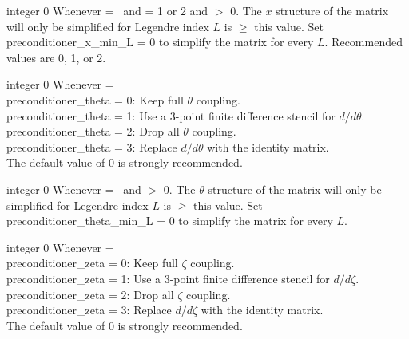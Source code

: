 \myhrule

{integer}
{0}
{Whenever  = \true~and  = 1 or 2 and  $>$ 0.}
{The $x$ structure of the matrix will only be simplified for Legendre index $L$ is $\ge$ this value.
Set {\ttfamily preconditioner\_x\_min\_L} = 0 to simplify the matrix for every $L$.
Recommended values are 0, 1, or 2.}

\myhrule

{integer}
{0}
{Whenever  = \true}
{\\
{\ttfamily preconditioner\_theta} = 0: Keep full $\theta$ coupling.\\

{\ttfamily preconditioner\_theta} = 1: Use a 3-point finite difference stencil for $d/d\theta$.\\

{\ttfamily preconditioner\_theta} = 2: Drop all $\theta$ coupling.\\

{\ttfamily preconditioner\_theta} = 3: Replace $d/d\theta$ with the identity matrix.\\

The default value of 0 is strongly recommended.}

\myhrule

{integer}
{0}
{Whenever  = \true~and  $>$ 0.}
{The $\theta$ structure of the matrix will only be simplified for Legendre index $L$ is $\ge$ this value.
Set {\ttfamily preconditioner\_theta\_min\_L} = 0 to simplify the matrix for every $L$.
}

\myhrule

{integer}
{0}
{Whenever  = \true}
{\\
{\ttfamily preconditioner\_zeta} = 0: Keep full $\zeta$ coupling.\\

{\ttfamily preconditioner\_zeta} = 1: Use a 3-point finite difference stencil for $d/d\zeta$.\\

{\ttfamily preconditioner\_zeta} = 2: Drop all $\zeta$ coupling.\\

{\ttfamily preconditioner\_zeta} = 3: Replace $d/d\zeta$ with the identity matrix.\\

The default value of 0 is strongly recommended.}

